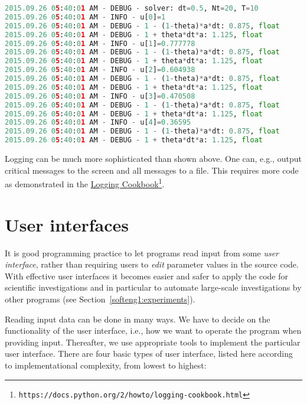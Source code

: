 \documentclass[graybox,sectrefs,envcountresetchap,open=right,final]{svmonodo}
\begin{document}
\begin{lstlisting}[language=Python,style=gray]
2015.09.26 05:40:01 AM - DEBUG - solver: dt=0.5, Nt=20, T=10
2015.09.26 05:40:01 AM - INFO - u[0]=1
2015.09.26 05:40:01 AM - DEBUG - 1 - (1-theta)*a*dt: 0.875, float
2015.09.26 05:40:01 AM - DEBUG - 1 + theta*dt*a: 1.125, float
2015.09.26 05:40:01 AM - INFO - u[1]=0.777778
2015.09.26 05:40:01 AM - DEBUG - 1 - (1-theta)*a*dt: 0.875, float
2015.09.26 05:40:01 AM - DEBUG - 1 + theta*dt*a: 1.125, float
2015.09.26 05:40:01 AM - INFO - u[2]=0.604938
2015.09.26 05:40:01 AM - DEBUG - 1 - (1-theta)*a*dt: 0.875, float
2015.09.26 05:40:01 AM - DEBUG - 1 + theta*dt*a: 1.125, float
2015.09.26 05:40:01 AM - INFO - u[3]=0.470508
2015.09.26 05:40:01 AM - DEBUG - 1 - (1-theta)*a*dt: 0.875, float
2015.09.26 05:40:01 AM - DEBUG - 1 + theta*dt*a: 1.125, float
2015.09.26 05:40:01 AM - INFO - u[4]=0.36595
2015.09.26 05:40:01 AM - DEBUG - 1 - (1-theta)*a*dt: 0.875, float
2015.09.26 05:40:01 AM - DEBUG - 1 + theta*dt*a: 1.125, float

\end{lstlisting}


Logging can be much more sophisticated than shown above. One can, e.g.,
output critical messages to the screen and all messages to a file.
This requires more code as demonstrated in the \href{{https://docs.python.org/2/howto/logging-cookbook.html}}{Logging Cookbook}\footnote{\texttt{https://docs.python.org/2/howto/logging-cookbook.html}}.

\section{User interfaces}
\label{softeng1:basic:UI}

It is good programming practice to let programs read input from
some \emph{user interface}, rather than requiring users to \emph{edit}
parameter values in the source code. With effective user interfaces
it becomes easier and safer to apply the code for scientific investigations and
in particular to automate large-scale investigations by other programs
(see Section~\ref{softeng1:experiments}).

Reading input data can be done in many ways. We have to decide on the
functionality of the user interface, i.e., how we want to operate the
program when providing input. Thereafter, we use appropriate tools to
implement the particular user interface. There are four basic types
of user interface, listed here according to implementational
complexity, from lowest to highest:
\end{document}
